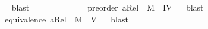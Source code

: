 \begin{isabellebody}
\ %
%
\isamarkupfalse%
\ blast%
%
%
\ \ \ \ \ \ \ \ \ \isanewline
\ \ \isamarkupfalse%
\ {\isachardoublequoteopen}preorder\ aRel\ {\isasymLongrightarrow}\ {\isasymlfloor}M{\isasymrfloor}\ {\isasymand}\ {\isasymlfloor}IV{\isasymrfloor}{\isachardoublequoteclose}%
\ %
%
\isamarkupfalse%
\ blast\ %
%
%
%
\isanewline
\ \ \isamarkupfalse%
\ {\isachardoublequoteopen}equivalence\ aRel\ {\isasymLongrightarrow}\ {\isasymlfloor}M{\isasymrfloor}\ {\isasymand}\ {\isasymlfloor}V{\isasymrfloor}{\isachardoublequoteclose}%
\ %
%
\isamarkupfalse%
\ blast\ %
%
%
%
%
%
%
%
%
%
%
%
%
%
%
%
%
%
%
%
%
%
%
%
%
%
%
%
%
%
%
%
%
%
%
%
%
%
%
%
%
%
%
%
%
%
%
%
%
%
%
%
%
%
%
%
%
%
%
%
%
%
%
%
%
%
%
%
%
%
%
%
%
%
%
%
%
%
%
%
%
%
%
\end{isabellebody}%
